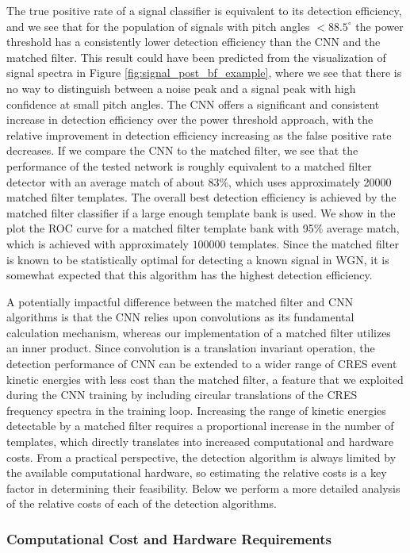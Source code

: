 The true positive rate of a signal classifier is equivalent to its detection efficiency, and we see that for the population of signals with pitch angles $<88.5^\circ$ the power threshold has a consistently lower detection efficiency than the CNN and the matched filter. This result could have been predicted from the visualization of signal spectra in Figure \ref{fig:signal_post_bf_example}, where we see that there is no way to distinguish between a noise peak and a signal peak with high confidence at small pitch angles. The CNN offers a significant and consistent increase in detection efficiency over the power threshold approach, with the relative improvement in detection efficiency increasing as the false positive rate decreases. If we compare the CNN to the matched filter, we see that the performance of the tested network is roughly equivalent to a matched filter detector with an average match of about 83\%, which uses approximately 20000 matched filter templates. The overall best detection efficiency is achieved by the matched filter classifier if a large enough template bank is used. We show in the plot the ROC curve for a matched filter template bank with 95\% average match, which is achieved with approximately $100000$ templates. Since the matched filter is known to be statistically optimal for detecting a known signal in WGN, it is somewhat expected that this algorithm has the highest detection efficiency.

A potentially impactful difference between the matched filter and CNN algorithms is that the CNN relies upon convolutions as its fundamental calculation mechanism, whereas our implementation of a matched filter utilizes an inner product. Since convolution is a translation invariant operation, the detection performance of CNN can be extended to a wider range of CRES event kinetic energies with less cost than the matched filter, a feature that we exploited during the CNN training by including circular translations of the CRES frequency spectra in the training loop. Increasing the range of kinetic energies detectable by a matched filter requires a proportional increase in the number of templates, which directly translates into increased computational and hardware costs. From a practical perspective, the detection algorithm is always limited by the available computational hardware, so estimating the relative costs is a key factor in determining their feasibility. Below we perform a more detailed analysis of the relative costs of each of the detection algorithms.


\subsubsection{Computational Cost and Hardware Requirements}
\label{sec:dis-comp-cost}


